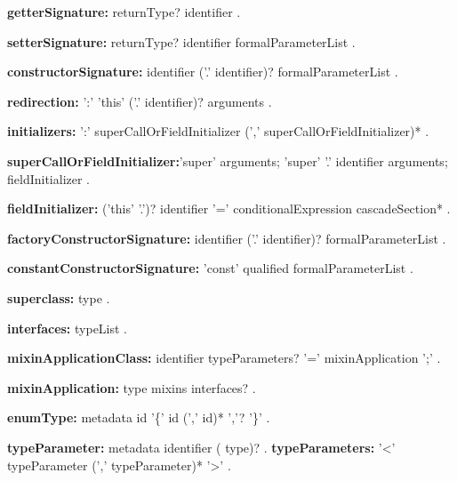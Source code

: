\begin{grammar}
{\bf getterSignature:}
       returnType? \GET{} identifier 
.
\end{grammar}
\begin{grammar}
{\bf setterSignature:}
       returnType? \SET{} identifier formalParameterList
.
\end{grammar}
\begin{grammar}
{\bf constructorSignature:}
      identifier ('.' identifier)? formalParameterList
    .
 \end{grammar}
\begin{grammar}
{\bf redirection:}
     ':' 'this' ('.' identifier)? arguments
    .
\end{grammar}
\begin{grammar}
{\bf initializers:}
      ':' superCallOrFieldInitializer (',' superCallOrFieldInitializer)*
    .


{\bf superCallOrFieldInitializer:}'super' arguments;
      'super' '.' identifier arguments;
     fieldInitializer
    .
    
   {\bf  fieldInitializer:}
      ('this' '.')? identifier '=' conditionalExpression cascadeSection*
    .

\end{grammar}
\begin{grammar}
{\bf factoryConstructorSignature:}
      \FACTORY{} identifier  ('.' identifier)?  formalParameterList
    .
\end{grammar}
\begin{grammar}
{\bf constantConstructorSignature:}
      'const' qualified formalParameterList
    .
\end{grammar}
\begin{grammar}
{\bf superclass:}
      \EXTENDS{} type
    .
\end{grammar}
\begin{grammar}
{\bf interfaces:}
      \IMPLEMENTS{} typeList
    .
\end{grammar}
\begin{grammar}
{\bf  mixinApplicationClass:}
  identifier typeParameters? '='  mixinApplication ';' .
  
{\bf mixinApplication:}
     type mixins interfaces? 
    .
\end{grammar}
\begin{grammar}
{\bf enumType:}
metadata \ENUM{} id '\{' id (',' id)* ','? '\}'
    .
\end{grammar}
\begin{grammar}
{\bf typeParameter:}
     metadata identifier (\EXTENDS{} type)?
    .
{\bf typeParameters:}
     '<' typeParameter (',' typeParameter)* '>'
    .
\end{grammar}
